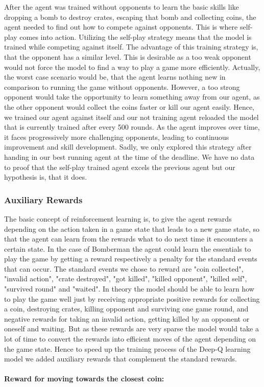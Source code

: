 After the agent was trained without opponents to learn the basic skills like dropping a bomb to destroy crates, escaping that bomb and collecting coins, the agent needed to find out how to compete against opponents. This is where self-play comes into action. Utilizing the self-play strategy means that the model is trained while competing against itself. The advantage of this training strategy is, that the opponent has a similar level. This is desirable as a too weak opponent would not force the model to find a way to play a game more efficiently. Actually, the worst case scenario would be, that the agent learns nothing new in comparison to running the game without opponents. However, a too strong opponent would take the opportunity to learn something away from our agent, as the other opponent would collect the coins faster or kill our agent easily. Hence, we trained our agent against itself and our not training agent reloaded the model that is currently trained after every 500 rounds. As the agent improves over time, it faces progressively more challenging opponents, leading to continuous improvement and skill development. \cite{selfplay} Sadly, we only explored this strategy after handing in our best running agent at the time of the deadline. We have no data to proof that the self-play trained agent excels the previous agent but our hypothesis is, that it does.

\subsubsection{Auxiliary Rewards} \label{sec:rewards}

The basic concept of reinforcement learning is, to give the agent rewards depending on the action taken in a game state that leads to a new game state, so that the agent can learn from the rewards what to do next time it encounters a certain state. In the case of Bomberman the agent could learn the essentials to play the game by getting a reward respectively a penalty for the standard events that can occur. The standard events we chose to reward are "coin collected", "invalid action", "crate destroyed", "got killed",  "killed opponent", "killed self", "survived round" and "waited". In theory the model should be able to learn how to play the game well just by receiving appropriate positive rewards for collecting a coin, destroying crates, killing opponent and surviving one game round, and negative rewards for taking an invalid action, getting killed by an opponent or oneself and waiting. But as these rewards are very sparse the model would take a lot of time to convert the rewards into efficient moves of the agent depending on the game state. Hence to speed up the training process of the Deep-Q learning model we added auxiliary rewards that complement the standard rewards.
\\ \\
\textbf{Reward for moving towards the closest coin:} \\

